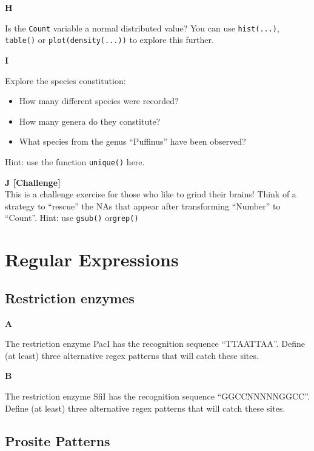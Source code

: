 \documentclass[]{book}
\providecommand{\tightlist}{%
  \setlength{\itemsep}{0pt}\setlength{\parskip}{0pt}}
\begin{document}
\textbf{H}

Is the \texttt{Count} variable a normal distributed value? You can use \texttt{hist(...)}, \texttt{table()} or \texttt{plot(density(...))} to explore this further.

\textbf{I}

Explore the species constitution:

\begin{itemize}
\tightlist
\item
  How many different species were recorded?
\item
  How many genera do they constitute?
\item
  What species from the genus ``Puffinus'' have been observed?
\end{itemize}

Hint: use the function \texttt{unique()} here.

\textbf{J {[}Challenge{]}}\\
This is a challenge exercise for those who like to grind their brains! Think of a strategy to ``rescue'' the NAs that appear after transforming ``Number'' to ``Count''. Hint: use \texttt{gsub()} or\texttt{grep()}

\hypertarget{regular-expressions}{%
\section{Regular Expressions}\label{regular-expressions}}

\hypertarget{restriction-enzymes}{%
\subsection{Restriction enzymes}\label{restriction-enzymes}}

\textbf{A}

The restriction enzyme PacI has the recognition sequence ``TTAATTAA''. Define (at least) three alternative regex patterns that will catch these sites.

\textbf{B}

The restriction enzyme SfiI has the recognition sequence ``GGCCNNNNNGGCC''. Define (at least) three alternative regex patterns that will catch these sites.

\hypertarget{prosite-patterns}{%
\subsection{Prosite Patterns}\label{prosite-patterns}}
\end{document}
